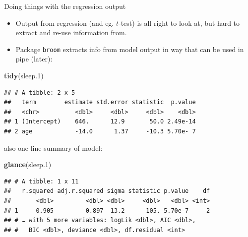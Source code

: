 \documentclass[ignorenonframetext,]{beamer}
\newenvironment{Shaded}{\begin{snugshade}}{\end{snugshade}}
\newcommand{\FloatTok}[1]{\textcolor[rgb]{0.00,0.00,0.81}{#1}}
\newcommand{\KeywordTok}[1]{\textcolor[rgb]{0.13,0.29,0.53}{\textbf{#1}}}
\newcommand{\NormalTok}[1]{#1}
\begin{document}
\begin{frame}[fragile]{Doing things with the regression output}
\protect\hypertarget{doing-things-with-the-regression-output}{}

\begin{itemize}
\item
  Output from regression (and eg. \(t\)-test) is all right to look at,
  but hard to extract and re-use information from.
\item
  Package \texttt{broom} extracts info from model output in way that can
  be used in pipe (later):
\end{itemize}

\begin{Shaded}
\begin{Highlighting}[]
\KeywordTok{tidy}\NormalTok{(sleep}\FloatTok{.1}\NormalTok{)}
\end{Highlighting}
\end{Shaded}

\begin{verbatim}
## # A tibble: 2 x 5
##   term        estimate std.error statistic  p.value
##   <chr>          <dbl>     <dbl>     <dbl>    <dbl>
## 1 (Intercept)    646.      12.9       50.0 2.49e-14
## 2 age            -14.0      1.37     -10.3 5.70e- 7
\end{verbatim}

\end{frame}

\begin{frame}[fragile]{also one-line summary of model:}
\protect\hypertarget{also-one-line-summary-of-model}{}

\begin{Shaded}
\begin{Highlighting}[]
\KeywordTok{glance}\NormalTok{(sleep}\FloatTok{.1}\NormalTok{)}
\end{Highlighting}
\end{Shaded}

\begin{verbatim}
## # A tibble: 1 x 11
##   r.squared adj.r.squared sigma statistic p.value    df
##       <dbl>         <dbl> <dbl>     <dbl>   <dbl> <int>
## 1     0.905         0.897  13.2      105. 5.70e-7     2
## # … with 5 more variables: logLik <dbl>, AIC <dbl>,
## #   BIC <dbl>, deviance <dbl>, df.residual <int>
\end{verbatim}

\end{frame}
\end{document}
